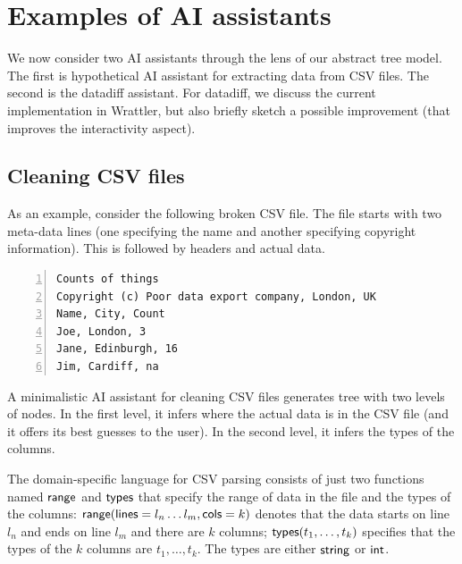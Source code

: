 \documentclass{article}
\begin{document}
\section{Examples of AI assistants}
\label{sec:examples}


We now consider two AI assistants through the lens of our abstract tree model.
The first is hypothetical AI assistant for extracting data from CSV files. The second
is the datadiff assistant. For datadiff, we discuss the current implementation in Wrattler, but
also briefly sketch a possible improvement (that improves the interactivity aspect).

\subsection{Cleaning CSV files}

  
As an example, consider the following broken CSV file. The file starts with two meta-data lines
(one specifying the name and another specifying copyright information). This is followed by headers
and actual data.

\begin{Verbatim}[numbers=left,xleftmargin=8mm]
Counts of things
Copyright (c) Poor data export company, London, UK
Name, City, Count
Joe, London, 3
Jane, Edinburgh, 16
Jim, Cardiff, na
\end{Verbatim}

A minimalistic AI assistant for cleaning CSV files generates tree with two levels of nodes. 
In the first level, it infers where the actual data is in the CSV file (and it offers 
its best guesses to the user). In the second level, it infers the types of the columns. 

The domain-specific language for CSV parsing consists of just two functions named
$\textnormal{\sffamily range}$ and $\textnormal{\sffamily types}$ that specify the range of data in the file and the types
of the columns: $\textnormal{\sffamily range}(\textnormal{\sffamily lines}=l_n\ldots l_m, \textnormal{\sffamily cols}=k)$ denotes that
the data starts on line $l_n$ and ends on line $l_m$ and there are $k$ columns; 
$\textnormal{\sffamily types}(t_1,\ldots, t_k)$ specifies that the types of the $k$ columns are 
$t_1, \ldots, t_k$. The types are either $\textnormal{\sffamily string}$ or $\textnormal{\sffamily int}$.
\end{document}
